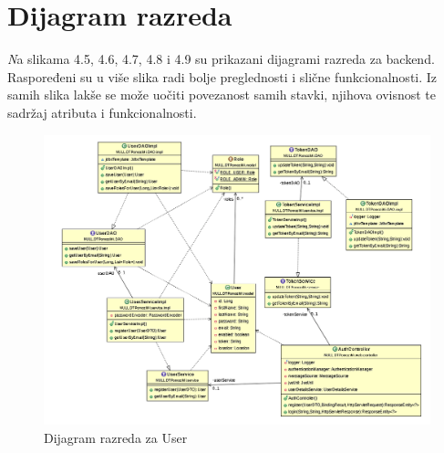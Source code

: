 {			\eject
			
		\section{Dijagram razreda}
		
			\textit Na slikama 4.5, 4.6, 4.7, 4.8 i 4.9 su prikazani dijagrami razreda za backend. Raspoređeni su u više slika radi bolje preglednosti i slične funkcionalnosti. Iz samih slika lakše se može uočiti povezanost samih stavki, njihova ovisnost te sadržaj atributa i funkcionalnosti.
			\begin{figure}[H]
				\includegraphics[scale=0.65]{slike/user.png} %
				\centering
				\caption { Dijagram razreda za User}
				\label{fig:promjene}
			\end{figure}
		
}
